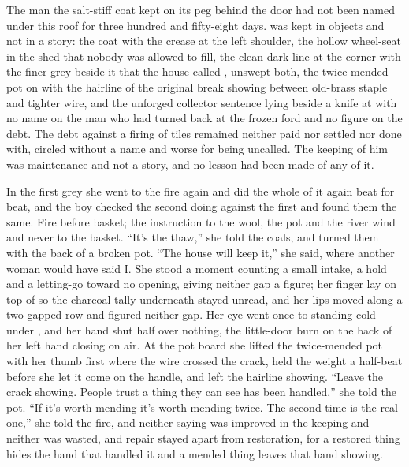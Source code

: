 The man the salt-stiff coat kept on its peg behind the door had not been named under this roof for three hundred and fifty-eight days.  was kept in objects and not in a story: the coat with the crease at the left shoulder, the hollow wheel-seat in the shed that nobody was allowed to fill, the clean dark line at the corner with the finer grey beside it that the house called , unswept both, the twice-mended pot on  with the hairline of the original break showing between old-brass staple and tighter wire, and the unforged collector sentence lying beside a knife at  with no name on the man who had turned back at the frozen ford and no figure on the debt. The debt against a firing of tiles remained neither paid nor settled nor done with, circled without a name and worse for being uncalled. The keeping of him was maintenance and not a story, and no lesson had been made of any of it.

\scenebreak

In the first grey she went to the fire again and did the whole of it again beat for beat, and the boy checked the second doing against the first and found them the same. Fire before basket; the instruction to the wool, the pot and the river wind and never to the basket. “It's the thaw,” she told the coals, and turned them with the back of a broken pot. “The house will keep it,” she said, where another woman would have said I. She stood a moment counting a small intake, a hold and a letting-go toward no opening, giving neither gap a figure; her finger lay on top of  so the charcoal tally underneath stayed unread, and her lips moved along a two-gapped row and figured neither gap. Her eye went once to  standing cold under , and her hand shut half over nothing, the little-door burn on the back of her left hand closing on air. At the pot board she lifted the twice-mended pot with her thumb first where the wire crossed the crack, held the weight a half-beat before she let it come on the handle, and left the hairline showing. “Leave the crack showing. People trust a thing they can see has been handled,” she told the pot. “If it's worth mending it's worth mending twice. The second time is the real one,” she told the fire, and neither saying was improved in the keeping and neither was wasted, and repair stayed apart from restoration, for a restored thing hides the hand that handled it and a mended thing leaves that hand showing.

